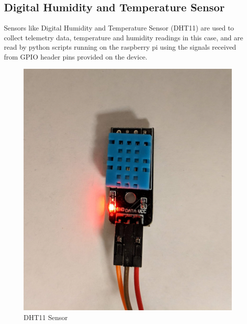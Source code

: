 \documentclass[11pt,openright]{report}
\begin{document}
\subsection{Digital Humidity and Temperature Sensor}
Sensors like Digital Humidity and Temperature Sensor (DHT11) are used to collect telemetry data, temperature and humidity readings in this case, and are read by python scripts running on the raspberry pi using the signals received from GPIO header pins provided on the device.
\newline
\newline
\begin{figure}[!htbp]
    \centering
    \includegraphics[scale=0.1]{images/dht11.jpg}
    \caption{DHT11 Sensor}
    \label{fig:dht11}
\end{figure}
\newline
\newline
\end{document}
